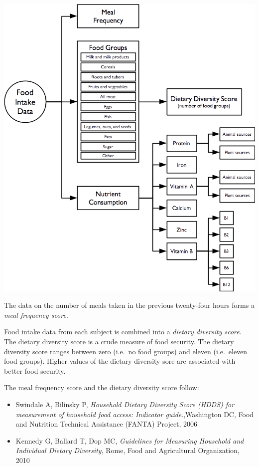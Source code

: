 \documentclass[12pt,a4paper]{book}
\theoremstyle{definition}
\theoremstyle{definition}
\theoremstyle{definition}
\theoremstyle{remark}
\begin{document}
\begin{center}\includegraphics{figures/indicators04} \end{center}

The data on the number of meals taken in the previous twenty-four hours
forms a \emph{meal frequency score}.

Food intake data from each subject is combined into a \emph{dietary
diversity score}. The dietary diversity score is a crude measure of food
security. The dietary diversity score ranges between zero (i.e.~no food
groups) and eleven (i.e.~eleven food groups). Higher values of the
dietary diversity sore are associated with better food security.

The meal frequency score and the dietary diversity score follow:

\begin{itemize}
\item
  Swindale A, Bilinsky P, \emph{Household Dietary Diversity Score (HDDS)
  for measurement of household food access: Indicator guide}.,Washington
  DC, Food and Nutrition Technical Assistance (FANTA) Project, 2006
\item
  Kennedy G, Ballard T, Dop MC, \emph{Guidelines for Measuring Household
  and Individual Dietary Diversity}, Rome, Food and Agricultural
  Organization, 2010
\end{itemize}
\end{document}
